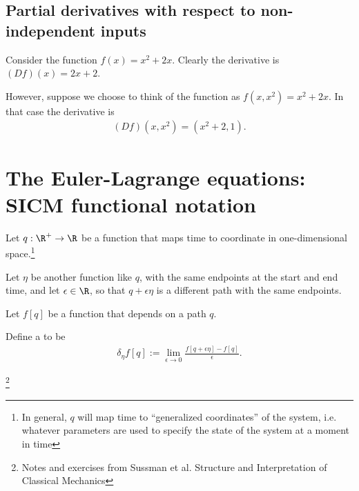 \subsection{Partial derivatives with respect to non-independent inputs}

Consider the function $f(x) = x^2 + 2x$. Clearly the derivative is $(D f)(x) = 2x + 2$.

However, suppose we choose to think of the function as $f(x, x^2) = x^2 + 2x$. In that case the
derivative is
\begin{align*}
  (D f)(x, x^2) = (x^2 + 2, 1).
\end{align*}




\section{The Euler-Lagrange equations: SICM functional notation}

Let $q:\R^+ \to \R$ be a function that maps time to coordinate in one-dimensional space.\footnote{In
  general, $q$ will map time to ``generalized coordinates'' of the system, i.e. whatever parameters
  are used to specify the state of the system at a moment in time}

Let $\eta$ be another function like $q$, with the same endpoints at the start and end time, and let
$\epsilon \in \R$, so that $q + \epsilon\eta$ is a different path with the same endpoints.


Let $f[q]$ be a function that depends on a path $q$.

Define a  to be
\begin{align*}
  \delta_{\eta}f[q] := \lim_{\epsilon \to 0} \frac{f[q + \epsilon\eta] - f[q]}{\epsilon}.
\end{align*}

\newpage
\footnote{Notes and exercises from Sussman et al. Structure and Interpretation of Classical Mechanics}
